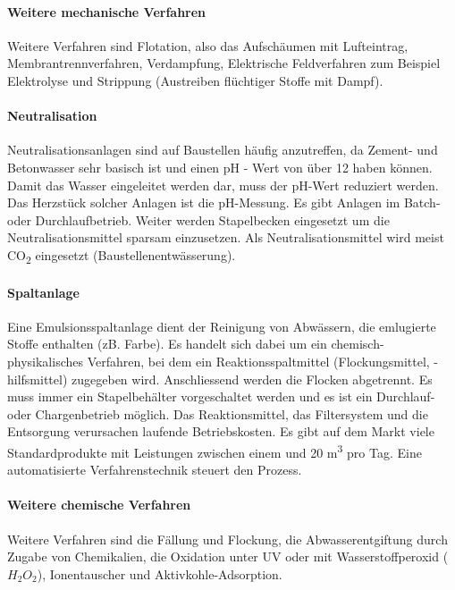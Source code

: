 \documentclass[9pt, openright=false]{scrartcl}
\begin{document}
\paragraph{Weitere mechanische Verfahren} Weitere Verfahren sind Flotation, also das Aufschäumen mit Lufteintrag, Membrantrennverfahren, Verdampfung, Elektrische Feldverfahren zum Beispiel Elektrolyse und Strippung (Austreiben flüchtiger Stoffe mit Dampf). 
\paragraph{Neutralisation} Neutralisationsanlagen sind auf Baustellen häufig anzutreffen, da Zement- und Betonwasser sehr basisch ist und einen pH - Wert von über 12 haben können. Damit das Wasser eingeleitet werden dar, muss der pH-Wert reduziert werden. Das Herzstück solcher Anlagen ist die pH-Messung. Es gibt Anlagen im Batch- oder Durchlaufbetrieb. Weiter werden Stapelbecken eingesetzt um die Neutralisationsmittel sparsam einzusetzen. Als Neutralisationsmittel wird meist CO\textsubscript{2} eingesetzt (Baustellenentwässerung). 
\paragraph{Spaltanlage} Eine Emulsionsspaltanlage dient der Reinigung von Abwässern, die emlugierte Stoffe enthalten (zB. Farbe). Es handelt sich dabei um ein chemisch-physikalisches Verfahren, bei dem ein Reaktionsspaltmittel (Flockungsmittel, -hilfsmittel) zugegeben wird. Anschliessend werden die Flocken abgetrennt. Es muss immer ein Stapelbehälter vorgeschaltet werden und es ist ein Durchlauf- oder Chargenbetrieb möglich. Das Reaktionsmittel, das Filtersystem und die Entsorgung verursachen laufende Betriebskosten. Es gibt auf dem Markt viele Standardprodukte mit Leistungen zwischen einem und 20 m\textsuperscript{3} pro Tag. Eine automatisierte Verfahrenstechnik steuert den Prozess.
\paragraph{Weitere chemische Verfahren} Weitere Verfahren sind die Fällung und Flockung, die Abwasserentgiftung durch Zugabe von Chemikalien, die Oxidation unter UV oder mit Wasserstoffperoxid ($H_2O_2$), Ionentauscher und Aktivkohle-Adsorption. \clearpage
\end{document}
